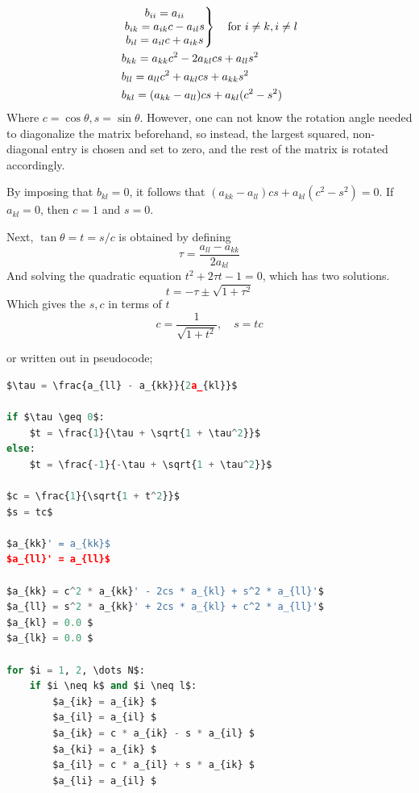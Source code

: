 \documentclass[10pt,showpacs,preprintnumbers,footinbib,amsmath,amssymb,aps,prl,twocolumn,groupedaddress,superscriptaddress,showkeys]{revtex4-1}
\begin{document}
    \begin{align}
      \begin{split}
      &\left.
      \begin{matrix}
        b_{ii} = a_{ii}            \\
        b_{ik} = a_{ik}c - a_{il}s \\
        b_{il} = a_{il}c + a_{ik}s            \\
      \end{matrix} \right\}
       \quad \textup{for } i\neq k, i\neq l \\
       &b_{kk} = a_{kk}c^2 - 2a_{kl}cs + a_{ll}s^2 \\
       &b_{ll} = a_{ll}c^2 + a_{kl}cs + a_{kk}s^2 \\
       &b_{kl} = (a_{kk} - a_{ll})cs + a_{kl}(c^2 - s^2)
      \end{split}
    \end{align}
    Where $c = \cos \theta, s = \sin \theta$. However, one can not know the rotation angle needed to diagonalize the matrix beforehand, so instead, the largest squared, non-diagonal entry is chosen and set to zero, and the rest of the matrix is rotated accordingly.

    By imposing that $b_{kl}=0$, it follows that $(a_{kk} - a_{ll})cs + a_{kl}(c^2 - s^2) = 0$. If $a_{kl}=0$, then $c=1$ and $s=0$.

    Next, $\tan \theta = t = s/c$ is obtained by defining
    \begin{equation}
      \tau = \frac{a_{ll} - a_{kk}}{2a_{kl}}
    \end{equation}
    And solving the quadratic equation $t^2 + 2\tau t - 1 = 0$, which has two solutions.
    \begin{equation}
      t = - \tau \pm \sqrt{1 + \tau^2}
    \end{equation}
    Which gives the $s, c$ in terms of $t$
    \begin{equation}
      c = \frac{1}{\sqrt{1 + t^2}}, \quad s = tc
    \end{equation}

   or written out in pseudocode; 
\begin{lstlisting}[mathescape=true, language=python, title=Jacobi Eigenvalue Algorithm]
$\tau = \frac{a_{ll} - a_{kk}}{2a_{kl}}$

if $\tau \geq 0$:
    $t = \frac{1}{\tau + \sqrt{1 + \tau^2}}$
else:
    $t = \frac{-1}{-\tau + \sqrt{1 + \tau^2}}$

$c = \frac{1}{\sqrt{1 + t^2}}$
$s = tc$

$a_{kk}' = a_{kk}$
$a_{ll}' = a_{ll}$

$a_{kk} = c^2 * a_{kk}' - 2cs * a_{kl} + s^2 * a_{ll}'$
$a_{ll} = s^2 * a_{kk}' + 2cs * a_{kl} + c^2 * a_{ll}'$
$a_{kl} = 0.0 $
$a_{lk} = 0.0 $

for $i = 1, 2, \dots N$:
    if $i \neq k$ and $i \neq l$:
        $a_{ik} = a_{ik} $
        $a_{il} = a_{il} $
        $a_{ik} = c * a_{ik} - s * a_{il} $
        $a_{ki} = a_{ik} $
        $a_{il} = c * a_{il} + s * a_{ik} $
        $a_{li} = a_{il} $
\end{lstlisting}
\end{document}
